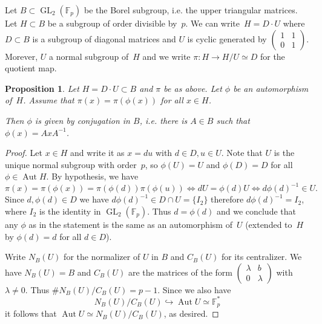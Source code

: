 \documentclass[12pt]{amsart}
\newcommand{\F}{\mathbb{F}}
\DeclareMathOperator{\Aut}{Aut}
\newcommand{\GL}{\operatorname{GL}}
\numberwithin{equation}{section}
\newtheorem{proposition}[theorem]{Proposition}
\theoremstyle{definition}
\theoremstyle{remark}
\begin{document}
Let $B \subset \GL_2(\F_p)$ be the Borel subgroup, i.e. the upper triangular matrices. Let $H \subset B$ be a subgroup of order divisible by~$p$. 
We can write~$H = D\cdot U$ where $D \subset B$ is a subgroup of diagonal matrices and 
$U$ is cyclic generated by $\left(\begin{smallmatrix}
                            1 & 1 \\
                            0 & 1
                            \end{smallmatrix} \right)$.   
Morever, $U$ a normal subgroup of~$H$ 
and we write $\pi : H \to H/U \simeq D$ for the quotient map.

\begin{proposition} \label{P:inner}
Let $H = D \cdot U \subset B$ and $\pi$ be as above. 
Let $\phi$ be an automorphism of~$H$. Assume that  
$\pi(x) = \pi(\phi(x))$ for all $x \in H$. 

Then $\phi$ is given by conjugation in $B$, i.e. there is $A \in B$ such that $\phi(x) = AxA^{-1}$. 
\end{proposition}
\begin{proof}
Let $x \in H$ and write it as $x = du$ with $d \in D, u \in U$.
Note that $U$ is the unique normal subgroup with order~$p$, so 
$\phi(U) = U$ and $\phi(D)=D$ for all $\phi \in \Aut H$.
By hypothesis, we have 
\[
 \pi(x) = \pi(\phi(x)) = \pi(\phi(d))\pi(\phi(u)) \iff dU = \phi(d)U
 \iff d\phi(d)^{-1} \in U.
\]
Since $d, \phi(d) \in D$ we have $d\phi(d)^{-1} \in D \cap U = \{ I_2\}$ therefore $d\phi(d)^{-1} = I_2$, where $I_2$ is the identity in $\GL_2(\F_p)$.
Thus $d = \phi(d)$ and we conclude that any $\phi$ 
as in the statement is the same as an automorphism of~$U$ (extended to~$H$ by $\phi(d)=d$ for all $d\in D$). 

Write $N_B(U)$  for the normalizer of $U$ in $B$ and $C_B(U)$ for its centralizer. 
We have $N_B(U) = B$ 
and $C_B(U)$ are the matrices of the form $\left(\begin{smallmatrix}
                            \lambda & b \\
                            0 & \lambda
                            \end{smallmatrix} \right)$
with $\lambda \neq 0$. Thus $\# N_B(U)/C_B(U) = p-1$. 
Since  we also have 
\[
 N_B(U)/C_B(U) \hookrightarrow \Aut U \simeq \F_p^*
\]
it follows that $\Aut U \simeq N_B(U)/C_B(U)$, as desired.
\end{proof}
\end{document}
